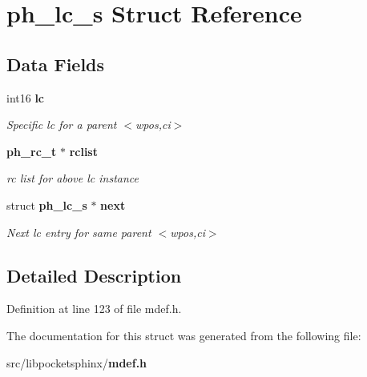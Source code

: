 \section{ph\-\_\-lc\-\_\-s Struct Reference}
\label{structph__lc__s}
\subsection*{Data Fields}
\begin{DoxyCompactItemize}
\item 
int16 {\bf lc}\label{structph__lc__s_adfb4e9553a4e2314543f9f1ef661185e}

\begin{DoxyCompactList}\small\item\em Specific lc for a parent $<$wpos,ci$>$ \end{DoxyCompactList}\item 
{\bf ph\-\_\-rc\-\_\-t} $\ast$ {\bf rclist}\label{structph__lc__s_aac24b848d70d96894c312d16050c4051}

\begin{DoxyCompactList}\small\item\em rc list for above lc instance \end{DoxyCompactList}\item 
struct {\bf ph\-\_\-lc\-\_\-s} $\ast$ {\bf next}\label{structph__lc__s_a5cda7044037678163c2242dde19df13a}

\begin{DoxyCompactList}\small\item\em Next lc entry for same parent $<$wpos,ci$>$ \end{DoxyCompactList}\end{DoxyCompactItemize}


\subsection{Detailed Description}


Definition at line 123 of file mdef.\-h.



The documentation for this struct was generated from the following file\-:\begin{DoxyCompactItemize}
\item 
src/libpocketsphinx/{\bf mdef.\-h}\end{DoxyCompactItemize}
